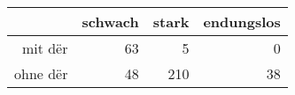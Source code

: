 \begin{tabular}{rrrr}
  \hline
 & schwach & stark & endungslos \\ 
  \hline
mit dër & 63 & 5 & 0 \\ 
  ohne dër & 48 & 210 & 38 \\ 
   \hline
\end{tabular}
